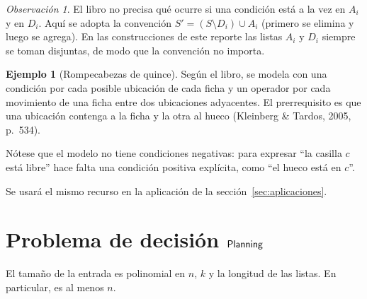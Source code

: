 \documentclass[11pt,letterpaper]{article}
\newcommand{\portadasf}{\fontencoding{T1}\fontfamily{lmss}\selectfont}
\DeclareRobustCommand{\nombreMatTitulo}[1]{%
  \mbox{\fontencoding{OT1}\fontfamily{cmss}\upshape\selectfont
        \MakeUppercase{#1}}}
\newcommand{\tituloseccion}[1]{%
  \begingroup
  \renewcommand{\nombreMat}[1]{\nombreMatTitulo{##1}}%
  \textls[120]{\MakeUppercase{#1}}%
  \endgroup}
\newcommand{\etiquetacaja}[1]{{\portadasf\bfseries\color{ink}#1}}
\theoremstyle{plain}
\theoremstyle{definition}
\newtheorem{ejemplo}[teorema]{Ejemplo}
\theoremstyle{remark}
\newtheorem{observacion}[teorema]{Observación}
\newcommand{\C}{\mathcal{C}}
\newcommand{\nombreMat}[1]{\ensuremath{\text{\fontencoding{OT1}\fontfamily{cmss}\upshape\selectfont #1}}}
\newcommand{\PLANNING}{\nombreMat{Planning}}
\begin{document}
\begin{observacion}
El libro no precisa qué ocurre si una condición está a la vez
en $A_i$ y en $D_i$. Aquí se adopta la convención
$S'=(S\setminus D_i)\cup A_i$ (primero se elimina y luego
se agrega). En las construcciones de este reporte las listas
$A_i$ y $D_i$ siempre se toman disjuntas, de modo que
la convención no importa.
\end{observacion}

\begin{ejemplo}[Rompecabezas de quince]
Según el libro, se modela con una condición por cada posible
ubicación de cada ficha y un operador por cada movimiento
de una ficha entre dos ubicaciones adyacentes.
El prerrequisito es que una ubicación contenga a la ficha
y la otra al hueco
(Kleinberg \& Tardos, 2005, p.~534).

Nótese que el modelo no tiene condiciones negativas:
para expresar ``la casilla $c$ está libre'' hace falta
una condición positiva explícita, como
``el hueco está en $c$''.

Se usará el mismo recurso en la aplicación
de la sección~\ref{sec:aplicaciones}.
\end{ejemplo}



\newpage
\section{Problema de decisión \PLANNING}



El tamaño de la entrada es polinomial en $n$, $k$
y la longitud de las listas. En particular,
es al menos $n$.
\end{document}
